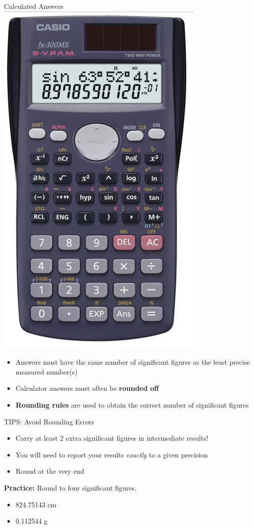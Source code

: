 \documentclass[11pt]{beamer}
\begin{document}
\begin{frame}{Calculated Answers}
  \centering
  \includegraphics[scale=0.2]{calc}
  \begin{itemize}
  \item Answers must have the same number of significant
    figures as the least precise measured number(s)
  \item Calculator answers must often be \textbf{rounded off}
  \item \textbf{Rounding rules} are used to obtain the correct
    number of significant figures
  \end{itemize}
\end{frame}

\begin{frame}{TIPS: Avoid Rounding Errors}
  \begin{itemize}
  \item Carry at least 2 extra significant figures in
    intermediate results!
  \item You will need to report your results \emph{exactly} to a
    given precision
  \item Round at the very end
  \end{itemize}

  \textbf{Practice:} Round to four significant figures.
  \begin{itemize}
  \item 824.75143 cm
  \item 0.112544 g
  \end{itemize}
\end{frame}
\end{document}
